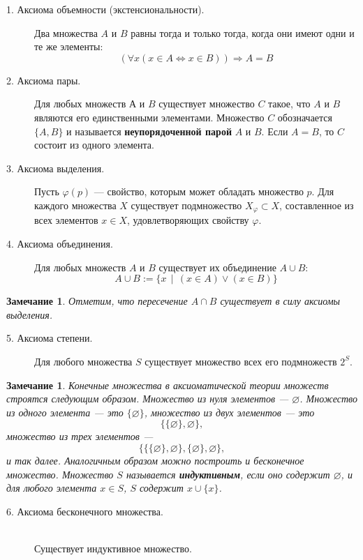 \documentclass[12pt]{book}
\renewcommand{\phi}{\varphi}
\renewcommand{\emptyset}{\varnothing}
\theoremstyle{upshape}
\newtheorem{zadacha}{Задача}[chapter]
\theoremstyle{generic}
\newtheorem{remark}[teorema]{Замечание}
\def\замечание{\begin{remark}}
\def\еза{\end{remark}}
\theoremstyle{upshapenonumber}
\newcommand{\следствие}{%
     \refstepcounter{teorema}
     {\noindent\bf Следствие \thechapter.\arabic{teorema}:\ }}
\newcommand{\пример}{%
     \refstepcounter{teorema}
     {\noindent\bf Пример \thechapter.\arabic{teorema}:\ }}
\newcommand{\лемма}{%
     \refstepcounter{teorema}
     {\noindent\bf Лемма \thechapter.\arabic{teorema}:\ }}
\newcommand{\теорема}{%
     \refstepcounter{teorema}
     {\noindent\bf Теорема \thechapter.\arabic{teorema}:\ }}
\newcommand{\утверждение}{%
     \refstepcounter{teorema}
     {\noindent\bf Утверждение \thechapter.\arabic{teorema}:\ }}
\def\бф{\bf}
\def\ем{\em}
\def\задача{\begin{zadacha}}
\def\ез{\end{zadacha}}
\def\еу{\end{ukazanie}}
\def\ео{\end{opredelenie}}
\def\енум{\begin{enumerate}}
\def\ее{\end{enumerate}}
\begin{document}
\begin{description}
\item[1. Аксиома объемности (экстенсиональности).]
Два множества $A$ и $B$ равны тогда и 
только тогда, когда они имеют одни и те же элементы:
\[
(\forall x (x\in A \Leftrightarrow x\in B)) \Rightarrow A=B
\]

\item[2. Аксиома пары.] Для любых множеств $А$ и $B$ существует
множество $C$ такое, что $A$ и $B$ являются его единственными
элементами. Множество $C$ обозначается $\{A,B\}$ и называется
{\bf неупорядоченной парой} $A$ и $B$. Если $A=B$, то $C$ состоит из
одного элемента.

\item[3. Аксиома выделения.] 
Пусть $\phi(p)$ --- свойство, которым может обладать
множество $p$. Для каждого множества $X$ существует
подмножество $X_\phi\subset X$, составленное из всех
элементов $x\in X$, удовлетворяющих свойству $\phi$.

\item[4. Аксиома объединения.] 
 Для любых множеств $A$ и $B$ существует их объединение $A\cup B$:
\[ 
A\cup B:= \{ x \ \  | \ \  (x\in A)\vee (x\in B) \}
\]

\end{description}

\замечание
Отметим, что пересечение $A\cap B$ существует в силу
аксиомы выделения.
\еза


\begin{description}
\item[5. Аксиома степени.] 
Для любого множества $S$ существует множество всех его подмножеств
$2^S$.

\end{description}

\замечание \label{_indukti_mno_Zamechanie_}
Конечные множества в аксиоматической теории
множеств строятся следующим образом. 
Множество из нуля элементов --- $\emptyset$.
Множество из одного элемента --- это $\{\emptyset\}$,
множество из двух элементов --- это
\[
\{ \{\emptyset\}, \emptyset\},
\]
множество из трех элементов --- 
\[
\{ \{ \{\emptyset\},\emptyset\}, \{\emptyset\}, \emptyset\},
\]
и так далее.  Аналогичным образом
можно построить и бесконечное множество.
Множество $S$ называется {\бф индуктивным},
если оно содержит $\emptyset$, и для любого
элемента $x\in S$, $S$ содержит $x\cup \{x\}$.
\еза
\begin{description}
\item[6. Аксиома бесконечного множества.]
\  \\ Существует индуктивное множество.
\end{description}
\end{document}
